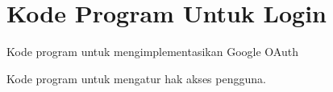 \chapter{Kode Program Untuk Login}
\label{Implementasi Modul Lihat Jadwal Dosen}

Kode program untuk mengimplementasikan Google OAuth
 


Kode program untuk mengatur hak akses pengguna.
 



